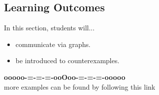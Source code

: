 \documentclass{ximera}
\begin{document}
\subsection*{Learning Outcomes}

\begin{sectionOutcomes}
In this section, students will...

\begin{itemize}
\item communicate via graphs.
\item be introduced to counterexamples.
\end{itemize}
\end{sectionOutcomes}


























\begin{onlineOnly}
\begin{center}
\textbf{\textcolor{green!50!black}{ooooo-=-=-=-ooOoo-=-=-=-ooooo}} \\

more examples can be found by following this link\\ 

\end{center}
\end{onlineOnly}
\end{document}
